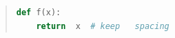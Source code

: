 \begin{quote}
\begin{lstlisting}[language=Python, frame=single]
def f(x):
    return  x  # keep   spacing
\end{lstlisting}
\end{quote}
